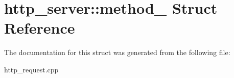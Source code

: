\hypertarget{structhttp__server_1_1method__}{
\section{http\-\_\-server\-:\-:method\-\_\- \-Struct \-Reference}
\label{structhttp__server_1_1method__}
}


\-The documentation for this struct was generated from the following file\-:\begin{DoxyCompactItemize}
\item 
http\-\_\-request.\-cpp\end{DoxyCompactItemize}
